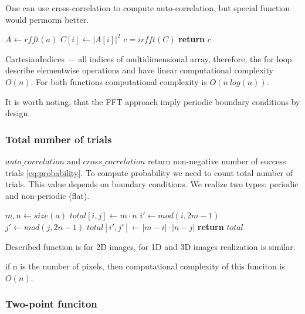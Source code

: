 \documentclass[reprint,amsmath,amssymb,aps,pre]{revtex4-1}
\begin{document}
One can use cross-correlation to compute auto-correlation,
but special function would permorm better.

\begin{algorithmic}[1]
    \State $A \gets rfft(a)$
      \State $C[i] \gets |A[i]|^2$
    \EndFor
    \State $c = irfft(C)$ 
    \State \textbf{return} $c$
  \EndProcedure
\end{algorithmic}

CartesianIndices --- all indices of multidimensional array,
therefore, the for loop describe elementwise operations
and have linear computational complexity $O(n)$.
For both functions computational complexity is $O(n\ log(n))$.

It is worth noting, that the FFT approach imply
periodic boundary conditions by design.

\subsubsection{Total number of trials}

$auto\_correlation$ and $cross\_correlation$ return non-negative number
of success trials \cref{eq:probability}.
To compute probability we need to count total number of trials.
This value depends on boundary conditions.
We realize two types: periodic and non-periodic (flat).

\begin{algorithmic}[1]
    \State $m, n \gets size(a)$
          \State $total[i, j] \gets m \cdot n$
        \EndFor
      \EndFor
    \Else
          \State $i' \gets mod(i, 2m - 1)$
          \State $j' \gets mod(j, 2n - 1)$
          \State $total[i', j'] \gets |m - i| \cdot |n - j|$
        \EndFor
      \EndFor
    \EndIf
    \State \textbf{return} $total$
  \EndProcedure
\end{algorithmic}

Described function is for 2D images,
for 1D and 3D images realization is similar.

if n is the number of pixels, then computational complexity
of this funciton is $O(n)$.

\subsubsection{Two-point funciton}
\end{document}
